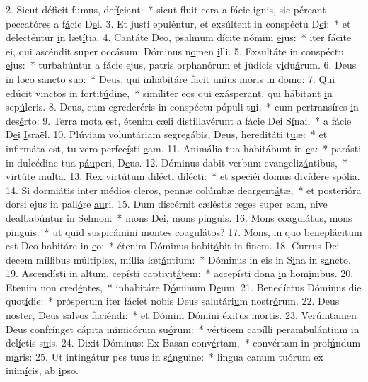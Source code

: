 2. Sicut déficit fumus, def\uline{í}ciant:~* sicut fluit cera a fácie ignis, sic péreant peccatóres a f\uline{á}cie D\uline{e}i.
3. Et justi epuléntur, et exsúltent in conspéctu D\uline{e}i:~* et delecténtur \uline{i}n læt\uline{í}tia.
4. Cantáte Deo, psalmum dícite nómini \uline{e}jus:~* iter fácite ei, qui ascéndit super occásum: Dóminus n\uline{o}men \uline{i}lli.
5. Exsultáte in conspéctu \uline{e}jus:~* turbabúntur a fácie ejus, patris orphanórum et júdicis v\uline{i}du\uline{á}rum.
6. Deus in loco sancto s\uline{u}o:~* Deus, qui inhabitáre facit uníus m\uline{o}ris in d\uline{o}mo:
7. Qui edúcit vinctos in fortit\uline{ú}dine,~* simíliter eos qui exásperant, qui hábitant \uline{i}n sep\uline{ú}lcris.
8. Deus, cum egrederéris in conspéctu pópuli t\uline{u}i,~* cum pertransíres \uline{i}n des\uline{é}rto:
9. Terra mota est, étenim cæli distillavérunt a fácie Dei S\uline{í}nai,~* a fácie D\uline{e}i \uline{I}sraël.
10. Plúviam voluntáriam segregábis, Deus, hereditáti t\uline{u}æ:~* et infirmáta est, tu vero perfec\uline{í}sti \uline{e}am.
11. Animália tua habitábunt in \uline{e}a:~* parásti in dulcédine tua p\uline{áu}peri, D\uline{e}us.
12. Dóminus dabit verbum evangeliz\uline{á}ntibus,~* virt\uline{ú}te m\uline{u}lta.
13. Rex virtútum dilécti dil\uline{é}cti:~* et speciéi domus div\uline{í}dere sp\uline{ó}lia.
14. Si dormiátis inter médios cleros, pennæ colúmbæ deargent\uline{á}tæ,~* et posterióra dorsi ejus in pall\uline{ó}re \uline{au}ri.
15. Dum discérnit cæléstis reges super eam, nive dealbabúntur in S\uline{e}lmon:~* mons D\uline{e}i, mons p\uline{i}nguis.
16. Mons coagulátus, mons p\uline{i}nguis:~* ut quid suspicámini montes co\uline{a}gul\uline{á}tos?
17. Mons, in quo beneplácitum est Deo habitáre in \uline{e}o:~* étenim Dóminus habit\uline{á}bit in f\uline{i}nem.
18. Currus Dei decem míllibus múltiplex, míllia læt\uline{á}ntium:~* Dóminus in eis in S\uline{i}na in s\uline{a}ncto.
19. Ascendísti in altum, cepísti captivit\uline{á}tem:~* accepísti dona \uline{i}n hom\uline{í}nibus.
20. Etenim non cred\uline{é}ntes,~* inhabitáre D\uline{ó}minum D\uline{e}um.
21. Benedíctus Dóminus die quot\uline{í}die:~* prósperum iter fáciet nobis Deus salutári\uline{u}m nostr\uline{ó}rum.
22. Deus noster, Deus salvos faci\uline{é}ndi:~* et Dómini Dómini \uline{é}xitus m\uline{o}rtis.
23. Verúmtamen Deus confrínget cápita inimicórum su\uline{ó}rum:~* vérticem capílli perambulántium in del\uline{í}ctis s\uline{u}is.
24. Dixit Dóminus: Ex Basan conv\uline{é}rtam,~* convértam in prof\uline{ú}ndum m\uline{a}ris:
25. Ut intingátur pes tuus in s\uline{á}nguine:~* lingua canum tuórum ex inim\uline{í}cis, ab \uline{i}pso.
